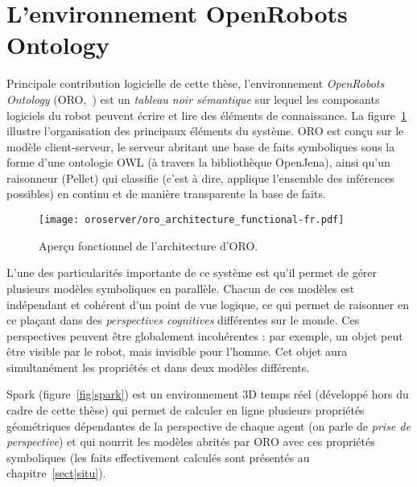
\section{L'environnement OpenRobots Ontology}

Principale contribution logicielle de cette thèse, l'environnement
\emph{OpenRobots Ontology} (ORO,~\cite{Lemaignan2010}) est un \emph{tableau
noir sémantique} sur lequel les composants logiciels du robot peuvent écrire et
lire des éléments de connaissance. La figure~\ref{fig|oro-overview} illustre
l'organisation des principaux éléments du système. ORO est conçu sur le modèle
client-serveur, le serveur abritant une base de faits symboliques sous la forme
d'une ontologie OWL (à travers la bibliothèque {\sc OpenJena}), ainsi qu'un
raisonneur ({\sc Pellet}) qui classifie (c'est à dire, applique l'ensemble des
inférences possibles) en continu et de manière transparente la base de faits.

\begin{figure}
\centering
  \texttt{[image: oroserver/oro\_architecture\_functional-fr.pdf]}
  \caption{Aperçu fonctionnel de l'architecture d'ORO.}
  \label{fig|oro-overview}
\end{figure}

L'une des particularités importante de ce système est qu'il permet de gérer
plusieurs modèles symboliques en parallèle. Chacun de ces modèles est
indépendant et cohérent d'un point de vue logique, ce qui permet de raisonner
en ce plaçant dans des \emph{perspectives cognitives} différentes sur le monde.
Ces perspectives peuvent être globalement incohérentes : par exemple, un objet
peut être visible par le robot, mais invisible pour l'homme. Cet objet aura
simultanément les propriétés  et
 dans deux modèles différents.

{\sc Spark} (figure~\ref{fig|spark}) est un environnement 3D temps réel
(développé hors du cadre de cette thèse) qui permet de calculer en ligne
plusieurs propriétés géométriques dépendantes de la perspective de chaque agent
(on parle de \emph{prise de perspective}) et qui nourrit les modèles abrités
par ORO avec ces propriétés symboliques (les faits effectivement calculés sont
présentés au chapitre~\ref{sect|situ}).

